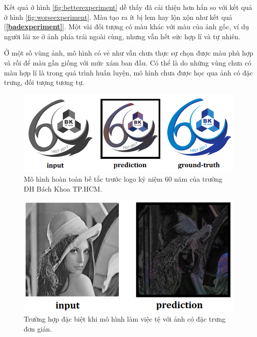 \documentclass[a4paper, 12pt]{report}
\begin{document}
\noindent
Kết quả ở hình \ref{fig:betterexperiment} dễ thấy đã cải thiện hơn hẳn so với kết quả ở hình \ref{fig:worseexperiment}.
Màu tạo ra ít bị lem hay lộn xộn như kết quả [\textbf{\ref{badexperiment}}].
Một vài đối tượng có màu khác với màu của ảnh gốc, ví dụ người lái xe ở ảnh phía trái ngoài cùng, nhưng vẫn hết sức hợp lí và tự nhiên.\vspace{5pt}

Ở một số vùng ảnh, mô hình có vẻ như vẫn chưa thực sự chọn được màu phù hợp và rồi để màu gần giống với mức xám ban đầu.
Có thể là do những vùng chưa có màu hợp lí là trong quá trình huấn luyện, mô hình chưa được học qua ảnh có đặc trưng, đối tượng tương tự.

\begin{figure}[!h]
\captionsetup{width=0.8\textwidth}
\centering
\includegraphics[width=15cm]{images/4_12.PNG}
\caption{Mô hình hoàn toàn bế tắc trước logo kỷ niệm 60 năm của trường ĐH Bách Khoa TP.HCM.}
\label{fig:failcolorlogo}
\end{figure}

\begin{figure}[!h]
\captionsetup{width=0.8\textwidth}
\centering
\includegraphics[width=15cm]{images/4_13.png}
\caption{Trường hợp đặc biệt khi mô hình làm việc tệ với ảnh có đặc trưng đơn giản.}
\label{fig:edgecase}
\end{figure}
\end{document}
